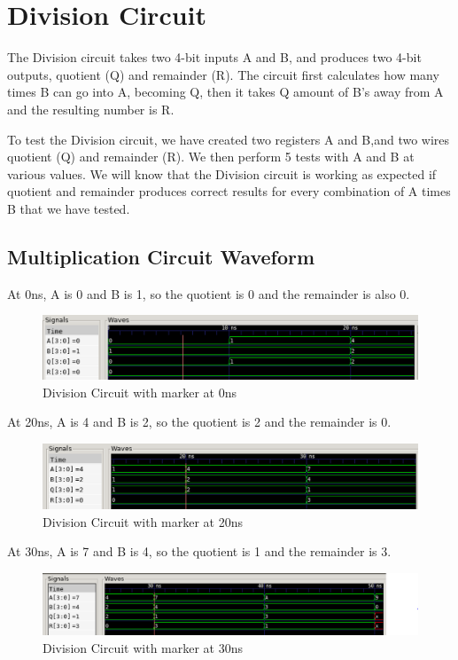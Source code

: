 \documentclass[12pt]{article}
\begin{document}
 \section{Division Circuit}
 The Division circuit takes two 4-bit inputs A and B, and produces two 4-bit outputs, quotient (Q) and remainder (R). The circuit first calculates how many times B can go into A, becoming Q, then it takes Q amount of B's away from A and the resulting number is R.
  
 
 To test the Division circuit, we have created two registers A and B,and two wires quotient (Q) and remainder (R). We then perform 5 tests with A and B at various values. We will know that the Division circuit is working as expected if quotient and remainder produces correct results for every combination of A times B that we have tested. 
 
 \subsection{Multiplication Circuit Waveform} 
 
 At 0ns, A is 0 and B is 1, so the quotient is 0 and the remainder is also 0.
 \begin{figure}[H]
  \centering
  \includegraphics[width = 1.0\textwidth]{Division/division_wave.png}
  \caption{Division Circuit with marker at 0ns}
  \label{fig:enter-label} 
 \end{figure} 
 
 At 20ns, A is 4 and B is 2, so the quotient is 2 and the remainder is 0.
  \begin{figure}[H]
  \centering 
 \includegraphics[width = 1.0\textwidth]{Division/division_wave1.png}
  \caption{Division Circuit with marker at 20ns}
  \label{fig:enter-label}
  \end{figure}
 
  At 30ns, A is 7 and B is 4, so the quotient is 1 and the remainder is 3.
  \begin{figure}[H]
  \centering 
 \includegraphics[width = 1.0\textwidth]{Division/division_wave2.png}
  \caption{Division Circuit with marker at 30ns}
  \label{fig:enter-label}
  \end{figure}
\end{document}
